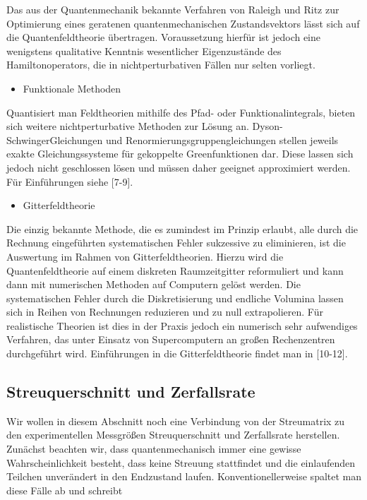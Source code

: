 \documentclass[10pt, letterpaper]{article}
\begin{document}
Das aus der Quantenmechanik bekannte Verfahren von Raleigh und Ritz zur Optimierung eines geratenen quantenmechanischen Zustandsvektors lässt sich auf die Quantenfeldtheorie übertragen. Voraussetzung hierfür ist jedoch eine wenigstens qualitative Kenntnis wesentlicher Eigenzustände des Hamiltonoperators, die in nichtperturbativen Fällen nur selten vorliegt.

\begin{itemize}
  \item Funktionale Methoden
\end{itemize}

Quantisiert man Feldtheorien mithilfe des Pfad- oder Funktionalintegrals, bieten sich weitere nichtperturbative Methoden zur Lösung an. Dyson-SchwingerGleichungen und Renormierungsgruppengleichungen stellen jeweils exakte Gleichungssysteme für gekoppelte Greenfunktionen dar. Diese lassen sich jedoch nicht geschlossen lösen und müssen daher geeignet approximiert werden. Für Einführungen siehe [7-9].

\begin{itemize}
  \item Gitterfeldtheorie
\end{itemize}

Die einzig bekannte Methode, die es zumindest im Prinzip erlaubt, alle durch die Rechnung eingeführten systematischen Fehler sukzessive zu eliminieren, ist die Auswertung im Rahmen von Gitterfeldtheorien. Hierzu wird die Quantenfeldtheorie auf einem diskreten Raumzeitgitter reformuliert und kann dann mit numerischen Methoden auf Computern gelöst werden. Die systematischen Fehler durch die Diskretisierung und endliche Volumina lassen sich in Reihen von Rechnungen reduzieren und zu null extrapolieren. Für realistische Theorien ist dies in der Praxis jedoch ein numerisch sehr aufwendiges Verfahren, das unter Einsatz von Supercomputern an großen Rechenzentren durchgeführt wird. Einführungen in die Gitterfeldtheorie findet man in [10-12].

\subsection*{Streuquerschnitt und Zerfallsrate}
Wir wollen in diesem Abschnitt noch eine Verbindung von der Streumatrix zu den experimentellen Messgrößen Streuquerschnitt und Zerfallsrate herstellen. Zunächst beachten wir, dass quantenmechanisch immer eine gewisse Wahrscheinlichkeit besteht, dass keine Streuung stattfindet und die einlaufenden Teilchen unverändert in den Endzustand laufen. Konventionellerweise spaltet man diese Fälle ab und schreibt
\end{document}
